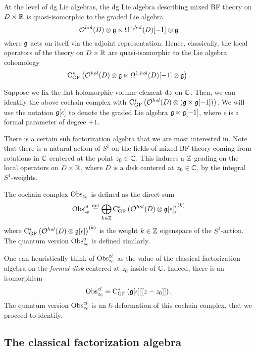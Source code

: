 \documentclass[11pt]{amsart}
\numberwithin{equation}{section}
\def\d{{\rm d}}
\def\GF{{\rm GF}}
\begin{document}
At the level of dg Lie algebras, the dg Lie algebra describing mixed BF theory on $D \times \mathbb R$ is quasi-isomorphic to the graded Lie algebra
\[
\mathcal O^{hol}(D) \otimes \mathfrak g \ltimes \Omega^{1,hol}(D) [-1] \otimes \mathfrak g
\]
where $\mathfrak g$ acts on itself via the adjoint representation. 
Hence, classically, the local operators of the theory on $D \times \mathbb R$ are quasi-isomorphic to the Lie algebra cohomology
\[
{\rm C}_{\GF}^* \left(\cO^{hol}(D) \otimes \fg \ltimes \Omega^{1,hol}(D) [-1] \otimes \fg \right) .
\] 

Suppose we fix the flat holomorphic volume element $\d z$ on $\mathbb C$. 
Then, we can identify the above cochain complex with ${\rm C}_{\GF}^* \left(\cO^{hol}(D) \otimes (\fg \ltimes \fg [-1])\right)$. 
We will use the notation $\mathfrak g[\epsilon]$ to denote the graded Lie algebra $\mathfrak g \ltimes \mathfrak g [-1]$, where $\epsilon$ is a formal parameter of degree $+1$. 

There is a certain sub factorization algebra that we are most interested in. 
Note that there is a natural action of $S^1$ on the fields of mixed BF theory coming from rotations in $\mathbb C$ centered at the point $z_0 \in \mathbb C$. 
This induces a $\mathbb Z$-grading on the local operators on $D \times \mathbb R$, where $D$ is a disk centered at $z_0 \in \mathbb C$, by the integral $S^1$-weights. 

\begin{dfn}
The cochain complex ${\rm Obs}_{z_0}$ is defined as the direct sum 
\[
\Obs^{cl}_{z_0} \overset{\rm def}{=}  \bigoplus_{k \in \ZZ} {\rm C}_{\GF}^* \left(\cO^{hol}(D) \otimes \fg[\epsilon] \right)^{(k)}
\]
where ${\rm C}_{\GF}^* \left(\cO^{hol}(D) \otimes \fg[\epsilon] \right)^{(k)}$ is the weight $k \in \mathbb Z$ eigenspace of the $S^1$-action. 
The quantum version ${\rm Obs}_{z_0}^{q}$ is defined similarly. 
\end{dfn}

One can heuristically think of ${\rm Obs}^{cl}_{z_0}$ as the value of the classical factorization algebra on the {\em formal disk} centered at $z_0$ inside of $\mathbb C$. 
Indeed, there is an isomorphism
\[
\Obs^{cl}_{z_0}  = {\rm C}_{\GF}^* \left(\fg[\epsilon][[z-z_0]]\right) .
\]
The quantum version ${\rm Obs}^{cl}_{z_0}$ is an $\hbar$-deformation of this cochain complex, that we proceed to identify. 

\subsection{The classical factorization algebra}
\end{document}
